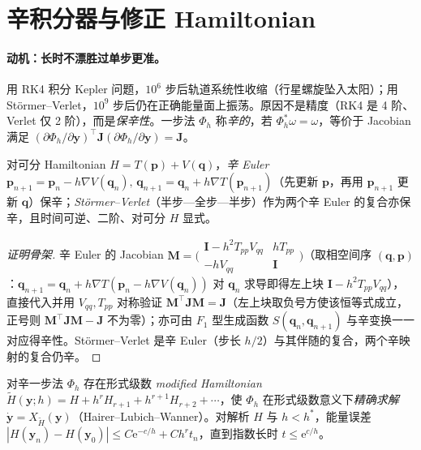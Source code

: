 \section{辛积分器与修正 Hamiltonian}
\label{sec:gm-integrators}

\paragraph{动机：长时不漂胜过单步更准。}
用 RK4 积分 Kepler 问题，$10^6$ 步后轨道系统性收缩（行星螺旋坠入太阳）；用 Störmer--Verlet，$10^9$ 步后仍在正确能量面上振荡。原因不是精度（RK4 是 4 阶、Verlet 仅 2 阶），而是\emph{保辛性}。一步法 $\Phi_h$ 称\emph{辛的}，若 $\Phi_h^*\omega=\omega$，等价于 Jacobian 满足 $(\partial\Phi_h/\partial\mathbf y)^\top\mathbf J(\partial\Phi_h/\partial\mathbf y)=\mathbf J$。

\begin{theorem}\label{thm:gm-symplectic-euler}
对可分 Hamiltonian $H=T(\mathbf p)+V(\mathbf q)$，\emph{辛 Euler} $\mathbf p_{n+1}=\mathbf p_n-h\nabla V(\mathbf q_n),\,\mathbf q_{n+1}=\mathbf q_n+h\nabla T(\mathbf p_{n+1})$（先更新 $\mathbf p$，再用 $\mathbf p_{n+1}$ 更新 $\mathbf q$）保辛；\emph{Störmer--Verlet}（半步—全步—半步）作为两个辛 Euler 的复合亦保辛，且时间可逆、二阶、对可分 $H$ 显式。
\end{theorem}

\begin{proof}[证明骨架]
辛 Euler 的 Jacobian $\mathbf M=\bigl(\begin{smallmatrix}\mathbf I-h^2 T_{pp}V_{qq} & h T_{pp}\\ -h V_{qq} & \mathbf I\end{smallmatrix}\bigr)$（取相空间序 $(\mathbf q,\mathbf p)$：$\mathbf q_{n+1}=\mathbf q_n+h\nabla T(\mathbf p_n-h\nabla V(\mathbf q_n))$ 对 $\mathbf q_n$ 求导即得左上块 $\mathbf I-h^2T_{pp}V_{qq}$），直接代入并用 $V_{qq},T_{pp}$ 对称验证 $\mathbf M^\top\mathbf J\mathbf M=\mathbf J$（左上块取负号方使该恒等式成立，正号则 $\mathbf M^\top\mathbf J\mathbf M-\mathbf J$ 不为零）；亦可由 $F_1$ 型生成函数 $S(\mathbf q_n,\mathbf q_{n+1})$ 与辛变换一一对应得辛性。Störmer--Verlet 是辛 Euler（步长 $h/2$）与其伴随的复合，两个辛映射的复合仍辛。
\end{proof}

\begin{theorem}\label{thm:gm-backward-error}
对辛一步法 $\Phi_h$ 存在形式级数 \emph{modified Hamiltonian} $\tilde H(\mathbf y;h)=H+h^r H_{r+1}+h^{r+1}H_{r+2}+\cdots$，使 $\Phi_h$ 在形式级数意义下\emph{精确求解} $\dot{\mathbf y}=X_{\tilde H}(\mathbf y)$（Hairer--Lubich--Wanner\cite{hairer2006geometric}）。对解析 $H$ 与 $h<h^*$，能量误差 $|H(\mathbf y_n)-H(\mathbf y_0)|\le C\mathrm e^{-c/h}+C h^r t_n$，直到指数长时 $t\le\mathrm e^{c/h}$。
\end{theorem}

